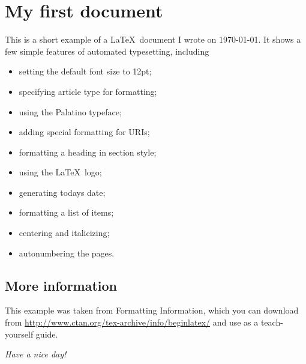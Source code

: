\documentclass[12pt]{article}
\begin{document}
\section*{My first document}
This is a short example of a \LaTeX\ document I wrote
on \today. It shows a few simple features of automated
typesetting, including
\begin{itemize}
\item setting the default font size to 12pt;
\item specifying article type for formatting;
\item using the Palatino typeface;
\item adding special formatting for URIs;
\item formatting a heading in section style;
\item using the \LaTeX\ logo;
\item generating todays date;
\item formatting a list of items;
\item centering and italicizing;
\item autonumbering the pages.
\end{itemize}
\subsection*{More information}
This example was taken from Formatting Information,
which you can download from
\url{http://www.ctan.org/tex-archive/info/beginlatex/}
and use as a teach-yourself guide.
\begin{center}
\textit{Have a nice day!}
\end{center}
\end{document}
